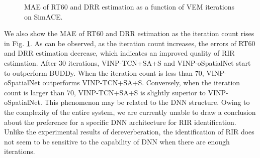 \begin{figure}
    \centering
    \caption{MAE of RT60 and DRR estimation as a function of VEM iterations on SimACE.}
    \label{fig:CurveRIR}
\end{figure}

We also show the MAE of RT60 and DRR estimation as the iteration count rises in Fig. \ref{fig:CurveRIR}.
As can be observed, as the iteration count increases, the errors of RT60 and DRR estimation decrease, which indicates an improved quality of RIR estimation.
After 30 iterations, VINP-TCN+SA+S and VINP-oSpatialNet start to outperform BUDDy.
When the iteration count is less than 70, VINP-oSpatialNet outperforms VINP-TCN+SA+S. 
Conversely, when the iteration count is larger than 70, VINP-TCN+SA+S is slightly superior to VINP-oSpatialNet.
This phenomenon may be related to the DNN structure. 
Owing to the complexity of the entire system, we are currently unable to draw a conclusion about the preference for a specific DNN architecture for RIR identification.
Unlike the experimental results of dereverberation, the identification of RIR does not seem to be sensitive to the capability of DNN when there are enough iterations.

